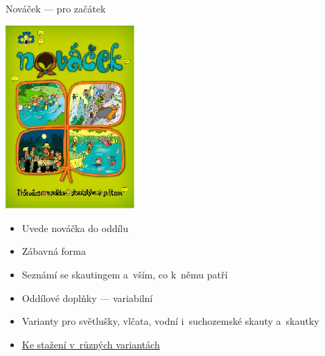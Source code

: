 \documentclass[compress, ucs, xelatex, xcolor=dvipsnames, print,
  hyperref={
    bookmarks=true,
    unicode=true,
    colorlinks=true,
    plainpages=false,
    pdfkeywords={Skaut, Junak, Skauting, Vychovna metoda},
    linkcolor=Black,
    anchorcolor=Black,
    citecolor=OliveGreen,
    filecolor=OliveGreen,
    menucolor=Black,
    urlcolor=OliveGreen,
    pdftex}
  ]{beamer}
\begin{document}
\begin{frame}{Nováček --- pro začátek}
  \begin{multicols}{2}
    \includegraphics[height=7cm]{novacek.png}
    \columnbreak
    \begin{itemize}
      \item Uvede nováčka do oddílu
      \item Zábavná forma
      \item Seznámí se skautingem a~vším, co k~němu patří
      \item Oddílové doplňky --- variabilní
      \item Varianty pro světlušky, vlčata, vodní i~suchozemské skauty a~skautky
      \item \href{https://krizovatka.skaut.cz/oddil/program/dle-vychovnych-kategorii/skauti-skautky/skauti-skautky-stezky/novacek}{Ke stažení v~různých variantách}
    \end{itemize}
  \end{multicols}
\end{frame}
\end{document}
